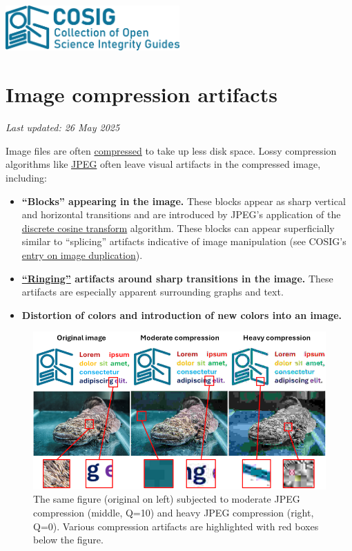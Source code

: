 \documentclass[letterpaper, 12pt]{article}
\begin{document}
\flushleft
\includegraphics[width=0.5\textwidth]{img/home/241017_final_logo_mockup.png}

\section*{Image compression artifacts}
\textit{Last updated: 26 May 2025}

Image files are often \href{https://en.wikipedia.org/wiki/Data_compression}{compressed} to take up less disk space. Lossy compression algorithms like \href{https://en.wikipedia.org/wiki/JPEG}{JPEG} often leave visual artifacts in the compressed image, including:

\begin{itemize}
    \setlength\itemsep{-0.5em}
    \item \textbf{``Blocks'' appearing in the image.} These blocks appear as sharp vertical and horizontal transitions and are introduced by JPEG's application of the \href{https://en.wikipedia.org/wiki/Discrete_cosine_transform}{discrete cosine transform} algorithm. These blocks can appear superficially similar to ``splicing'' artifacts indicative of image manipulation (see COSIG's \href{https://osf.io/547re}{entry on image duplication}).
    \item \textbf{\href{https://en.wikipedia.org/wiki/Ringing_artifacts}{``Ringing''} artifacts around sharp transitions in the image.} These artifacts are especially apparent surrounding graphs and text.
    \item \textbf{Distortion of colors and introduction of new colors into an image.}
\end{itemize}

\begin{figure}[h!tbp]
    \centering
    \includegraphics[width=\textwidth]{img/compression_artifacts/image_compression_fig_small.png}
    \caption*{The same figure (original on left) subjected to moderate JPEG compression (middle, Q=10) and heavy JPEG compression (right, Q=0). Various compression artifacts are highlighted with red boxes below the figure.}
\end{figure}
\end{document}
